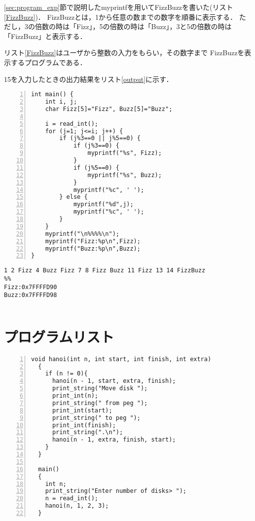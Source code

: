 \documentclass[11pt]{jarticle}
\begin{document}
\ref{sec:program_exp}節で説明したmyprintfを用いてFizzBuzzを書いた(リスト\ref{FizzBuzz})．
FizzBuzzとは，1から任意の数までの数字を順番に表示する．
ただし，3の倍数の時は「Fizz」，5の倍数の時は「Buzz」，3と5の倍数の時は「FizzBuzz」と表示する．

リスト\ref{FizzBuzz}はユーザから整数の入力をもらい，その数字まで
FizzBuzzを表示するプログラムである．

15を入力したときの出力結果をリスト\ref{output}に示す．

\begin{lstlisting}[caption=FizzBuzz,label=FizzBuzz,numbers=left]  
int main() {
    int i, j;
    char Fizz[5]="Fizz", Buzz[5]="Buzz";

    i = read_int();
    for (j=1; j<=i; j++) {
        if (j%3==0 || j%5==0) {
            if (j%3==0) {
                myprintf("%s", Fizz);
            }
            if (j%5==0) {
                myprintf("%s", Buzz);
            }
            myprintf("%c", ' ');
        } else {
            myprintf("%d",j);
            myprintf("%c", ' ');
        }
    }
    myprintf("\n%%%%\n");
    myprintf("Fizz:%p\n",Fizz);
    myprintf("Buzz:%p\n",Buzz);
}
\end{lstlisting}

\begin{lstlisting}[caption=出力結果,label=output]
1 2 Fizz 4 Buzz Fizz 7 8 Fizz Buzz 11 Fizz 13 14 FizzBuzz
%%
Fizz:0x7FFFFD90
Buzz:0x7FFFFD98
  
\end{lstlisting}

\section{プログラムリスト} \label{sec:program}

\begin{lstlisting}[caption=hanoi.c,label=hanoi,numbers=left]
  void hanoi(int n, int start, int finish, int extra)
  {
    if (n != 0){
      hanoi(n - 1, start, extra, finish);
      print_string("Move disk ");
      print_int(n);
      print_string(" from peg ");
      print_int(start);
      print_string(" to peg ");
      print_int(finish);
      print_string(".\n");
      hanoi(n - 1, extra, finish, start);
    }
  }
  
  main()
  {
    int n;
    print_string("Enter number of disks> ");
    n = read_int();
    hanoi(n, 1, 2, 3);
  }
\end{lstlisting}
\end{document}

